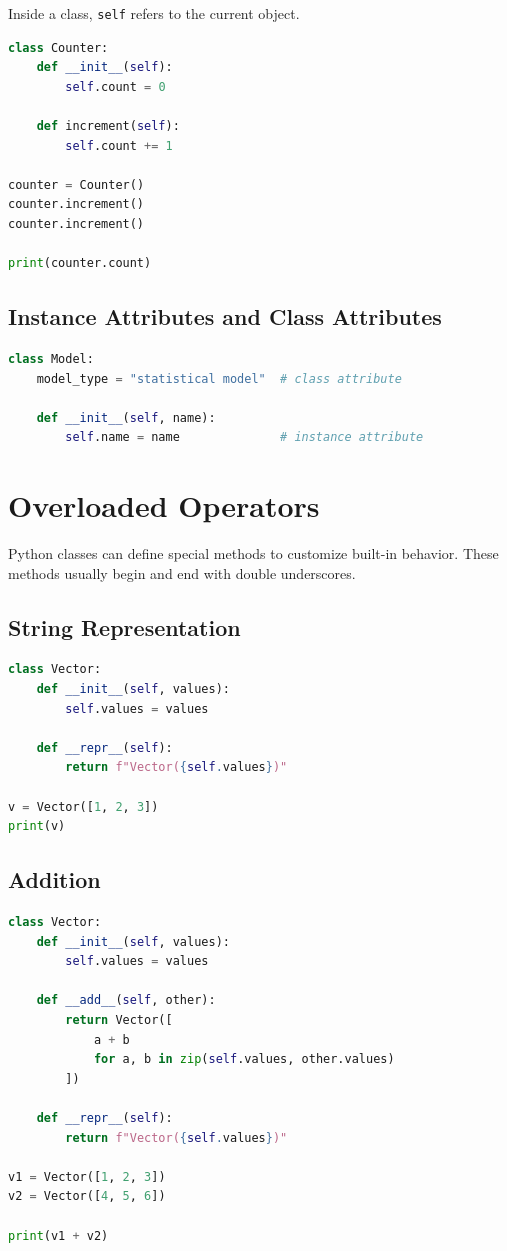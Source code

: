 \documentclass[12pt,oneside]{book}
\numberwithin{equation}{section}
\theoremstyle{definition}
\theoremstyle{plain}
\theoremstyle{remark}
\begin{document}
Inside a class, \texttt{self} refers to the current object.

\begin{lstlisting}[language=Python]
class Counter:
    def __init__(self):
        self.count = 0

    def increment(self):
        self.count += 1

counter = Counter()
counter.increment()
counter.increment()

print(counter.count)
\end{lstlisting}

\subsection{Instance Attributes and Class Attributes}

\begin{lstlisting}[language=Python]
class Model:
    model_type = "statistical model"  # class attribute

    def __init__(self, name):
        self.name = name              # instance attribute
\end{lstlisting}

\section{Overloaded Operators}

Python classes can define special methods to customize built-in behavior. These methods usually begin and end with double underscores.

\subsection{String Representation}

\begin{lstlisting}[language=Python]
class Vector:
    def __init__(self, values):
        self.values = values

    def __repr__(self):
        return f"Vector({self.values})"

v = Vector([1, 2, 3])
print(v)
\end{lstlisting}

\subsection{Addition}

\begin{lstlisting}[language=Python]
class Vector:
    def __init__(self, values):
        self.values = values

    def __add__(self, other):
        return Vector([
            a + b
            for a, b in zip(self.values, other.values)
        ])

    def __repr__(self):
        return f"Vector({self.values})"

v1 = Vector([1, 2, 3])
v2 = Vector([4, 5, 6])

print(v1 + v2)
\end{lstlisting}
\end{document}
